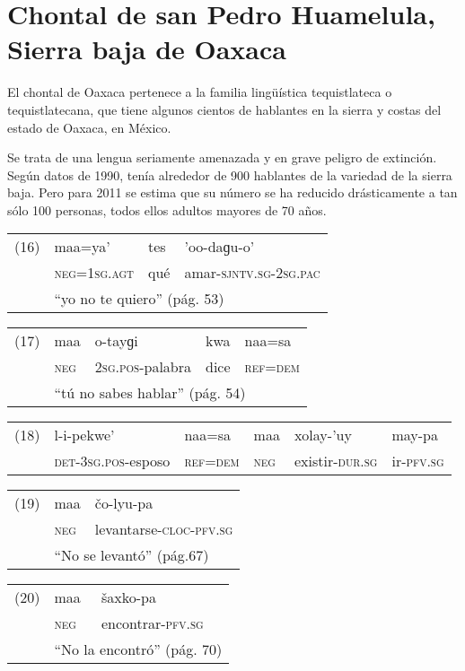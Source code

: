 \section*{Chontal de san Pedro Huamelula, Sierra baja de Oaxaca}

\noindent El chontal de Oaxaca pertenece a la familia lingüística tequistlateca o tequistlatecana, que tiene algunos cientos de hablantes en la sierra y costas del estado de Oaxaca, en México.

Se trata de una lengua seriamente amenazada y en grave peligro de extinción. Según datos de 1990, tenía alrededor de 900 hablantes de la variedad de la sierra baja. Pero para 2011 se estima que su número se ha reducido drásticamente a tan sólo 100 personas, todos ellos adultos mayores de 70 años. \vspace{0.5cm}

{\setmainfont{Doulos SIL}
\begin{tabular}{llll}
	(16) & maa=ya'& tes & 'oo-daɡu-o' \\
	& \textsc{neg}=\textsc{1sg.agt} & qué & amar-\textsc{sjntv.sg-2sg.pac} \\
	& \multicolumn{3}{l}{``yo no te quiero'' (pág. 53)}
\end{tabular} \vspace{0.5cm}

\begin{tabular}{lllll}
	(17) & maa & o-tayɡi & kwa & naa=sa \\
	& \textsc{neg} & \textsc{2sg.pos}-palabra & dice & \textsc{ref=dem} \\
	& \multicolumn{4}{l}{``tú no sabes hablar'' (pág. 54)}
\end{tabular} \vspace{0.5cm}

\begin{tabular}{llllll} %
	(18) & l-i-pekwe’ & naa=sa & maa & xolay-’uy & may-pa \\
	& \textsc{det-3sg.pos}-esposo & \textsc{ref=dem} & \textsc{neg} & existir-\textsc{dur.sg} & ir-\textsc{pfv.sg} \\
\end{tabular} \vspace{0.5cm}

\begin{tabular}{lll}
	(19) & maa & čo-lyu-pa \\
	& \textsc{neg} & levantarse-\textsc{cloc-pfv.sg} \\
	& \multicolumn{2}{l}{``No se levantó'' (pág.67)}
\end{tabular} \vspace{0.5cm}

\begin{tabular}{lll}
	(20) & maa & šaxko-pa \\
	& \textsc{neg} & encontrar-\textsc{pfv.sg} \\
	& \multicolumn{2}{l}{``No la encontró'' (pág. 70)}
\end{tabular} \vspace{0.5cm}
}

